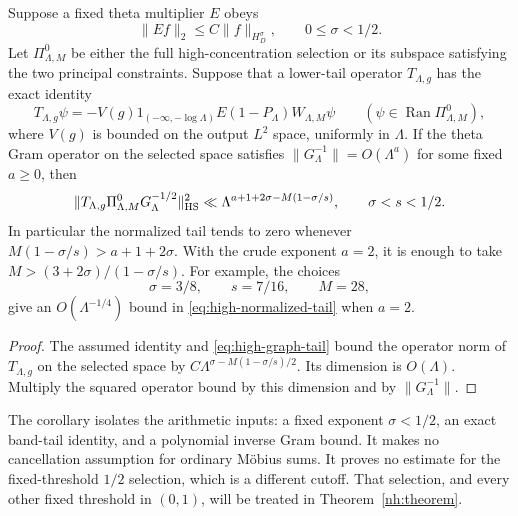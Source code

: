 \begin{corollary}
\label{cor:hankel-high-theta-tail}
Suppose a fixed theta multiplier $E$ obeys
\[
 \|Ef\|_2\leq C\|f\|_{H_D^\sigma},\qquad 0\leq\sigma<1/2.
\]
Let $\Pi^0_{\Lambda,M}$ be either the full high-concentration
selection or its subspace satisfying the two principal
constraints. Suppose that a lower-tail operator $T_{\Lambda,g}$
has the exact identity
\[
 T_{\Lambda,g}\psi
 =-V(g)1_{(-\infty,-\log\Lambda)}
                   E(1-P_\Lambda)W_{\Lambda,M}\psi
       \qquad(\psi\in\operatorname{Ran}\Pi^0_{\Lambda,M}),
\]
where $V(g)$ is bounded on the output $L^2$ space, uniformly in
$\Lambda$. If the theta Gram operator on the selected space
satisfies $\|G_\Lambda^{-1}\|=O(\Lambda^a)$ for some fixed
$a\geq0$, then
\begin{equation}
 \label{eq:high-normalized-tail}
 \|T_{\Lambda,g}\Pi^0_{\Lambda,M}G_\Lambda^{-1/2}\|_{\rm HS}^2
 \ll\Lambda^{a+1+2\sigma-M(1-\sigma/s)},
                 \qquad \sigma<s<1/2.
\end{equation}
In particular the normalized tail tends to zero whenever
$M(1-\sigma/s)>a+1+2\sigma$. With the crude exponent $a=2$,
it is enough to take $M>(3+2\sigma)/(1-\sigma/s)$.
For example, the choices
\[
 \sigma=3/8,\qquad s=7/16,\qquad M=28,
\]
give an $O(\Lambda^{-1/4})$ bound in
\eqref{eq:high-normalized-tail} when $a=2$.
\end{corollary}
\begin{proof}
The assumed identity and \eqref{eq:high-graph-tail} bound the
operator norm of $T_{\Lambda,g}$ on the selected space by
$C\Lambda^{\sigma-M(1-\sigma/s)/2}$. Its dimension is
$O(\Lambda)$. Multiply the squared operator bound by this
dimension and by $\|G_\Lambda^{-1}\|$.
\end{proof}

The corollary isolates the arithmetic inputs: a fixed exponent
$\sigma<1/2$, an exact band-tail identity, and a polynomial inverse
Gram bound. It makes no cancellation assumption for ordinary
M\"obius sums. It proves no estimate for the fixed-threshold
$1/2$ selection, which is a different cutoff. That selection, and
every other fixed threshold in $(0,1)$, will be treated in
Theorem~\ref{nh:theorem}.

